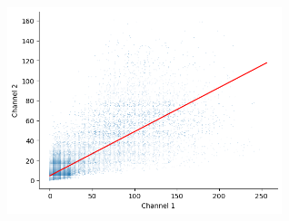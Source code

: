 \documentclass[ignorenonframetext,aspectratio=169,10pt,xcolor=table]{beamer}
\begin{document}
\begin{frame}
\begin{columns}
\begin{column}{0.4\textwidth}
      ~\\[1em]
      \includegraphics[width=0.6\textwidth]{colocalization_pcc.png}
    \end{column}
  \end{columns}
\end{frame}
\end{document}
